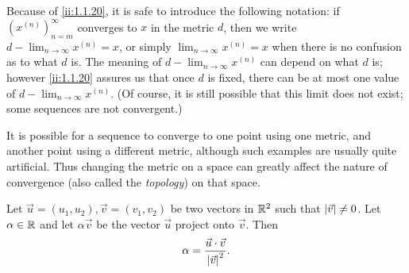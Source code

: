 \begin{note}
  Because of \cref{ii:1.1.20}, it is safe to introduce the following notation:
  if \((x^{(n)})_{n = m}^\infty\) converges to \(x\) in the metric \(d\), then we write \(d - \lim_{n \to \infty} x^{(n)} = x\), or simply \(\lim_{n \to \infty} x^{(n)} = x\) when there is no confusion as to what \(d\) is.
  The meaning of \(d - \lim_{n \to \infty} x^{(n)}\) can depend on what \(d\) is;
  however \cref{ii:1.1.20} assures us that once \(d\) is fixed, there can be at most one value of \(d - \lim_{n \to \infty} x^{(n)}\).
  (Of course, it is still possible that this limit does not exist;
  some sequences are not convergent.)
\end{note}

\begin{rmk}\label{ii:1.1.21}
  It is possible for a sequence to converge to one point using one metric, and another point using a different metric, although such examples are usually quite artificial.
  Thus changing the metric on a space can greatly affect the nature of convergence (also called the \emph{topology}) on that space.
\end{rmk}

\begin{ac}\label{ii:ac:1.1.1}
  Let \(\vec{u} = (u_1, u_2), \vec{v} = (v_1, v_2)\) be two vectors in \(\mathbb{R}^2\) such that \(\left\lvert\vec{v}\right\rvert \neq 0\).
  Let \(\alpha \in \mathbb{R}\) and let \(\alpha \vec{v}\) be the vector \(\vec{u}\) project onto \(\vec{v}\).
  Then
  \[
    \alpha = \dfrac{\vec{u} \cdot \vec{v}}{\left\lvert\vec{v}\right\rvert^2}.
  \]
\end{ac}

